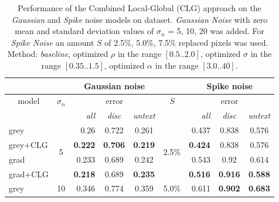 \begin{table}[ht] \scriptsize
  \centering
  \caption{Performance of the Combined Local-Global (CLG) approach on the \textit{Gaussian} and \textit{Spike} noise models on \rub dataset. \textit{Gaussian Noise} with zero mean  and standard deviation values of $\sigma_n$ = 5, 10, 20 was added. For \textit{Spike Noise} an amount $S$  of 2.5\%, 5.0\%, 7.5\% replaced pixels was used. Method: \textit{baseline}, optimized $\rho$ in the range $[0.5 .. 2.0]$, optimized $\sigma$ in the range $[0.35 .. 1.5]$, optimized $\alpha$ in the range $[3.0 .. 40]$.}
    \begin{tabular}{rrrrrrrrr}
    \toprule
          &       & \multicolumn{3}{c}{Gaussian noise} &       & \multicolumn{3}{c}{Spike noise} \\
    \midrule
    \multicolumn{1}{c}{model} & \multicolumn{1}{c}{$\sigma_n$} & \multicolumn{3}{c}{error} & \multicolumn{1}{c}{$S$} & \multicolumn{3}{c}{error} \\
    \midrule
    \multicolumn{1}{c}{} & \multicolumn{1}{c}{\textit{}} & \textit{all} & \multicolumn{1}{c}{\textit{disc}} & \multicolumn{1}{c}{\textit{untext}} & \multicolumn{1}{c}{\textit{}} & \textit{all} & \multicolumn{1}{c}{\textit{disc}} & \multicolumn{1}{c}{\textit{untext}} \\
    \midrule
    \midrule
    \multicolumn{1}{l}{grey} & \multicolumn{1}{c}{\multirow{4}[0]{*}{5}} & 0.26  & \multicolumn{1}{c}{0.722} & \multicolumn{1}{c}{0.261} & \multicolumn{1}{c}{\multirow{4}[0]{*}{2.5\%}} & 0.437 & \multicolumn{1}{c}{0.838} & \multicolumn{1}{c}{0.576} \\
    \multicolumn{1}{l}{grey+CLG} &       & \textbf{0.222} & \multicolumn{1}{c}{\textbf{0.706}} & \multicolumn{1}{c}{\textbf{0.219}} &       & \textbf{0.424} & \multicolumn{1}{c}{0.838} & \multicolumn{1}{c}{0.576} \\
    \multicolumn{1}{l}{grad} &       & 0.233 & \multicolumn{1}{c}{0.689} & \multicolumn{1}{c}{0.242} &       & 0.543 & \multicolumn{1}{c}{0.92} & \multicolumn{1}{c}{0.614} \\
    \multicolumn{1}{l}{grad+CLG} &       & \textbf{0.218} & \multicolumn{1}{c}{0.689} & \multicolumn{1}{c}{\textbf{0.235}} &       & \textbf{0.516} & \multicolumn{1}{c}{\textbf{0.916}} & \multicolumn{1}{c}{\textbf{0.588}} \\
    \midrule
    \multicolumn{1}{l}{grey} & \multicolumn{1}{c}{\multirow{4}[0]{*}{10}} & 0.346 & \multicolumn{1}{c}{0.774} & \multicolumn{1}{c}{0.359} & \multicolumn{1}{c}{\multirow{4}[0]{*}{5.0\%}} & 0.611 & \multicolumn{1}{c}{\textbf{0.902}} & \multicolumn{1}{c}{\textbf{0.683}} \\

\end{tabular}
\end{table}
